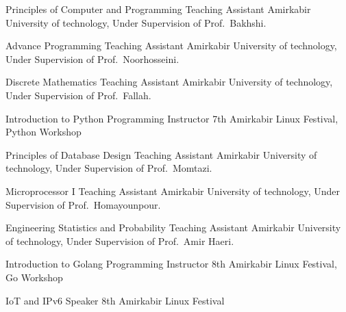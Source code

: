 \documentclass[]{friggeri-cv} %
\begin{document}
\begin{entrylist}

  {Principles of Computer and Programming}
  {Teaching Assistant}
  {Amirkabir University of technology, Under Supervision of Prof.\ Bakhshi.}


  {Advance Programming}
  {Teaching Assistant}
  {Amirkabir University of technology, Under Supervision of Prof.\ Noorhosseini.}


  {Discrete Mathematics}
  {Teaching Assistant}
  {Amirkabir University of technology, Under Supervision of Prof.\ Fallah.}


  {Introduction to Python Programming}
  {Instructor}
  {7th Amirkabir Linux Festival, Python Workshop}


  {Principles of Database Design}
  {Teaching Assistant}
  {Amirkabir University of technology, Under Supervision of Prof.\ Momtazi.}


  {Microprocessor I}
  {Teaching Assistant}
  {Amirkabir University of technology, Under Supervision of Prof.\ Homayounpour.}


  {Engineering Statistics and Probability}
  {Teaching Assistant}
  {Amirkabir University of technology, Under Supervision of Prof.\ Amir Haeri.}


  {Introduction to Golang Programming}
  {Instructor}
  {8th Amirkabir Linux Festival, Go Workshop}


  {IoT and IPv6}
  {Speaker}
  {8th Amirkabir Linux Festival}



\end{entrylist}
\end{document}
